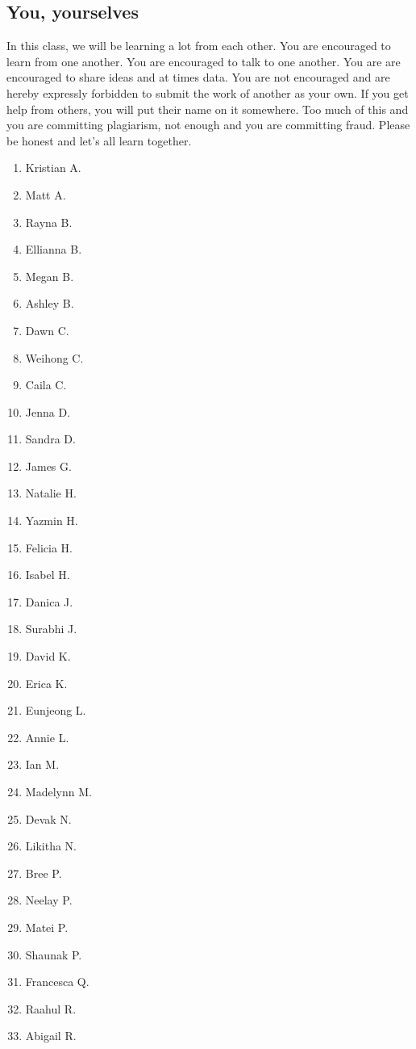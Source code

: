 \documentclass[11pt]{book}
\begin{document}
\subsection{You, yourselves}
In this class, we will be learning a lot from each other. You are encouraged to learn from one another. You are encouraged to talk to one another. You are are encouraged to share ideas and at times data. You are not encouraged and are hereby expressly forbidden to submit the work of another as your own. If you get help from others, you will put their name on it somewhere. Too much of this and you are committing plagiarism, not enough and you are committing fraud. Please be honest and let's all learn together.
\begin{enumerate}
	\item Kristian A.
	\item Matt A.
	\item Rayna B.
	\item Ellianna B.
	\item Megan B.
	\item Ashley B.
	\item Dawn C.
	\item Weihong C.
	\item Caila C.
	\item Jenna D.
	\item Sandra D.
	\item James G.
	\item Natalie H.
	\item Yazmin H.
	\item Felicia H.
	\item Isabel H.
	\item Danica J.
	\item Surabhi J.
	\item David K.
	\item Erica K.
	\item Eunjeong L.
	\item Annie L.
	\item Ian M.
	\item Madelynn M.
	\item Devak N.
	\item Likitha N.
	\item Bree P.
	\item Neelay P.
	\item Matei P.
	\item Shaunak P.
	\item Francesca Q.
	\item Raahul R.
	\item Abigail R.

\end{enumerate}
\end{document}
